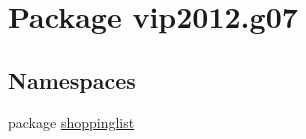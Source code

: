 \hypertarget{namespacevip2012_1_1g07}{\section{Package vip2012.\-g07}
\label{df/d3c/namespacevip2012_1_1g07}
}
\subsection*{Namespaces}
\begin{DoxyCompactItemize}
\item 
package \hyperlink{namespacevip2012_1_1g07_1_1shoppinglist}{shoppinglist}
\end{DoxyCompactItemize}
